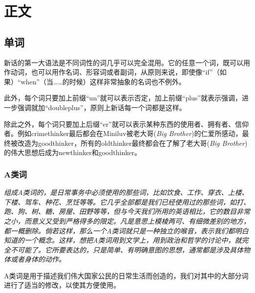 \documentclass[lang=cn, color=black, chinesefont=founder]{elegantbook}
\newcommand{\bb}{老大哥(\textit{Big Brother})}
\begin{document}
    \part{正文}
        \chapter{单词}
            新话的第一大语法是不同词性的词几乎可以完全混用。它的任意一个词，既可以用作动词，也可以用作名词、形容词或者副词，从原则来说，即使像“if”（如果）“when”（当……的时候）这样非常抽象的名词也不例外。

            此外，每个词只要加上前缀“un”就可以表示否定，加上前缀“plus”就表示强调，进一步强调就加“doubleplus”，原则上新话每一个词都是这样。

            除此之外，每个词只要加上后缀“er”就可以表示某种东西的使用者、拥有者、信仰者。例如crimethinker最后都会在Miniluv被\bb 的仁爱所感动，最终被改造为goodthinker，所有的oldthinker最终都会在了解了\bb 的伟大思想后成为newthinker和goodthinker。

            \section{A类词}
                \textit{
                    组成A类词的，是日常事务中必须使用的那些词，比如饮食、工作、穿衣、上楼、下楼、驾车、种花、烹饪等等。它几乎全部都是我们已经使用过的那些词，如打、跑、狗、树、糖、房屋、田野等等，但与今天我们所用的英语相比，它的数目非常之小，而意义又受到严格得多的限定。凡是意思上模棱两可、有细微差别的地方，都一概删除。倘若这样，那么一个A类词就只是一种独立的喉音，表示我们都明白知道的一个概念。这样，想把A类词用到文学上，用到政治和哲学的讨论中，就完全不可能了。它所要表达的，只是简单、有明确意图的思想，通常都是涉及具体物体或者身体的动作。
                }


                A类词是用于描述我们伟大国家公民的日常生活而创造的，我们对其中的大部分词进行了适当的修改，以使其方便使用。
\end{document}
